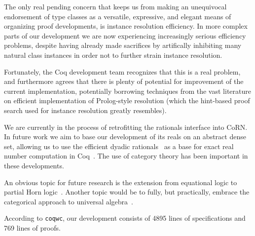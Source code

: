 \documentclass[a4paper,10pt,runningheads]{llncs}
\begin{document}
The only real pending concern that keeps us from making an unequivocal endorsement of type classes as a versatile, expressive, and elegant means of organizing proof developments, is instance resolution efficiency. In more complex parts of our development we are now experiencing increasingly serious efficiency problems, despite having already made sacrifices by artifically inhibiting many natural class instances in order not to further strain instance resolution.


Fortunately, the Coq development team recognizes that this is a real problem, and furthermore agrees that there is plenty of potential for improvement of the current implementation, potentially borrowing techniques from the vast literature on efficient implementation of Prolog-style resolution (which the hint-based proof search used for instance resolution greatly resembles).

We are currently in the process of retrofitting the rationals interface into CoRN. In future work we aim to base our development of its reals on an abstract dense set, allowing us to use the efficient dyadic rationals~\cite{boldo2009combining} as a base for exact real number computation in Coq~\cite{Riemann,Oconnor:real}. The use of category theory has been important in these developments.

An obvious topic for future research is the extension from equational logic to partial Horn
logic~\cite{palmgren2007partial}. Another topic would be to fully, but practically, embrace the
categorical approach to universal algebra~\cite{pitts2001categorical}.

According to \lstinline|coqwc|, our development consists of 4895 lines of
specifications and 769 lines of proofs.


% 
\end{document}
